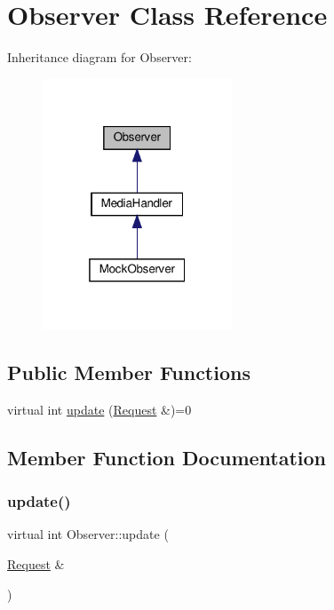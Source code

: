 \hypertarget{classObserver}{}\section{Observer Class Reference}
\label{classObserver}


Inheritance diagram for Observer\+:\nopagebreak
\begin{figure}[H]
\begin{center}
\leavevmode
\includegraphics[width=160pt]{classObserver__inherit__graph}
\end{center}
\end{figure}
\subsection*{Public Member Functions}
\begin{DoxyCompactItemize}
\item 
virtual int \hyperlink{classObserver_acc79119027d8770fe4946161d6274a00}{update} (\hyperlink{classRequest}{Request} \&)=0
\end{DoxyCompactItemize}


\subsection{Member Function Documentation}
\mbox{\label{classObserver_acc79119027d8770fe4946161d6274a00}} 
\subsubsection{\texorpdfstring{update()}{update()}}
{\footnotesize\ttfamily virtual int Observer\+::update (\begin{DoxyParamCaption}\item[{\hyperlink{classRequest}{Request} \&}]{ }\end{DoxyParamCaption})\hspace{0.3cm}{\ttfamily [pure virtual]}}

